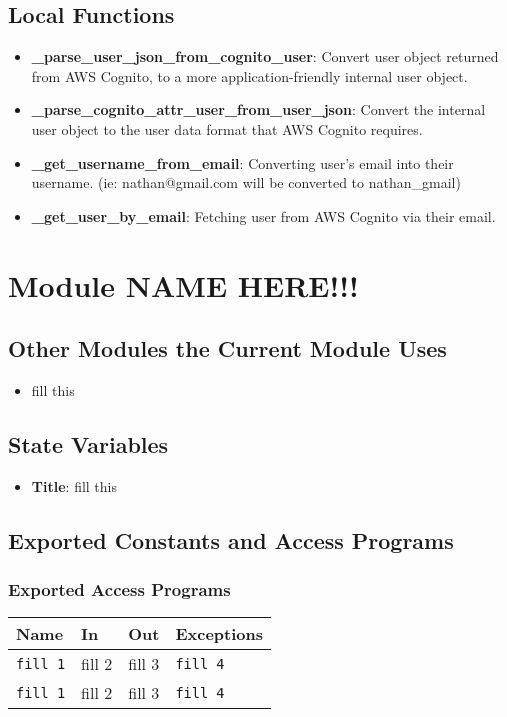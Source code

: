 \documentclass[12pt, titlepage]{article}
\begin{document}
\subsection{Local Functions}
\begin{itemize}
    \item \textbf{\_parse\_user\_json\_from\_cognito\_user}: Convert user object returned from AWS Cognito, to a more application-friendly internal user object.
    \item \textbf{\_parse\_cognito\_attr\_user\_from\_user\_json}: Convert the internal user object to the user data format that AWS Cognito requires.
    \item \textbf{\_get\_username\_from\_email}: Converting user's email into their username. (ie: nathan@gmail.com will be converted to nathan\_gmail)
    \item \textbf{\_get\_user\_by\_email}: Fetching user from AWS Cognito via their email. 
\end{itemize}
\section{Module NAME HERE!!!}

\subsection{Other Modules the Current Module Uses}
\begin{itemize}
    \item fill this 
\end{itemize}

\subsection{State Variables}
\begin{itemize}
    \item \textbf{Title}: fill this 
\end{itemize}

\subsection{Exported Constants and Access Programs}
\subsubsection{Exported Access Programs}
\begin{tabular}{|l|l|l|l|}
    \hline
    \textbf{Name} & \textbf{In} & \textbf{Out} & \textbf{Exceptions} \\
    \hline 
    \texttt{fill 1} & fill 2 & fill 3 & \texttt{fill 4} \\
    \hline
    \texttt{fill 1} & fill 2 & fill 3 & \texttt{fill 4} \\
    \hline
\end{tabular}
\end{document}
